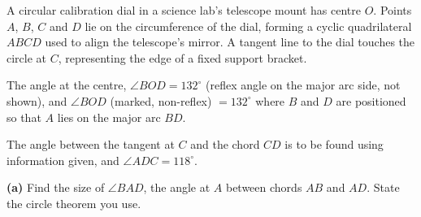 \begin{question}
\noindent A circular calibration dial in a science lab's telescope mount has centre $O$. Points $A$, $B$, $C$ and $D$ lie on the circumference of the dial, forming a cyclic quadrilateral $ABCD$ used to align the telescope's mirror. A tangent line to the dial touches the circle at $C$, representing the edge of a fixed support bracket.

The angle at the centre, $\angle BOD = 132^\circ$ (reflex angle on the major arc side, not shown), and $\angle BOD$ (marked, non-reflex) $=132^\circ$ where $B$ and $D$ are positioned so that $A$ lies on the major arc $BD$.

The angle between the tangent at $C$ and the chord $CD$ is to be found using information given, and $\angle ADC = 118^\circ$.

\begin{center}
\end{center}

\noindent \textbf{(a)} Find the size of $\angle BAD$, the angle at $A$ between chords $AB$ and $AD$. State the circle theorem you use.


\end{question}
